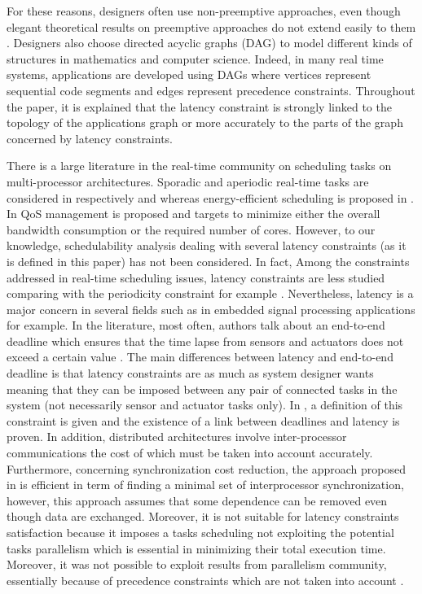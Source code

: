 \documentclass{ijcaArticle}
\begin{document}
For these reasons, designers often use non-preemptive approaches, even though
elegant theoretical results on preemptive approaches do not extend easily to them \cite{SERTS}.  Designers also choose directed acyclic graphs (DAG) to model different kinds of structures in mathematics and computer science. Indeed, in many real time systems, applications are developed using DAGs \cite{10.1109/RTCSA.2011.72} where vertices represent sequential code segments and edges represent precedence constraints. Throughout the paper, it is explained that the latency constraint is strongly linked to the topology of the applications graph or more accurately to the parts of the graph concerned by latency constraints.

There is a large literature in the real-time community on scheduling tasks on multi-processor architectures. Sporadic and aperiodic real-time tasks are considered in respectively  \cite{DBLP:conf/rtss/BaruahG08}  
and \cite{DBLP:conf/ecrts/BaruahL04} whereas energy-efficient scheduling is proposed in \cite{DBLP:conf/rtcsa/HuangCT11}. In \cite{journals/rts/AbeniCLMP05} QoS management is proposed and \cite{DBLP:journals/tii/ButtazzoBW11} targets to minimize either the overall
bandwidth consumption or the required number of cores. However, to our knowledge, schedulability analysis dealing with several latency constraints (as it is defined in this paper) has not been considered. In fact, Among the constraints addressed in real-time scheduling issues, latency constraints are less studied comparing with the periodicity constraint for example \cite{papierok}. Nevertheless, latency is a major concern in several fields such as in embedded signal processing applications \cite{Goddard98onthe} for example. In the literature, most often, authors talk about an end-to-end deadline which ensures that the time lapse from sensors and actuators does not exceed a certain value \cite{Hsueh_Lin_2000}. The main differences between latency and  end-to-end deadline is that latency constraints are as much as system designer wants meaning that they can be imposed between any pair of connected tasks in the system (not necessarily sensor and actuator tasks only). 
In \cite{aor07}, a definition of this constraint is given and the existence of a link between deadlines and latency is proven. In addition, distributed architectures involve inter-processor communications the cost of which must be taken into account accurately. Furthermore, concerning synchronization cost reduction, the approach proposed in \cite{Chao94minimizingredundant} is efficient in term of finding a minimal set of interprocessor synchronization, however, this approach
assumes that some dependence can be removed even though data are exchanged. Moreover, it is not suitable for latency constraints satisfaction because it imposes a tasks scheduling not exploiting the potential tasks parallelism which is essential in minimizing their total execution time.   Moreover, it was not possible to exploit results from parallelism community, essentially because of precedence constraints which are not taken into account \cite{Cucinotta11-SOMRES}.     
\end{document}
